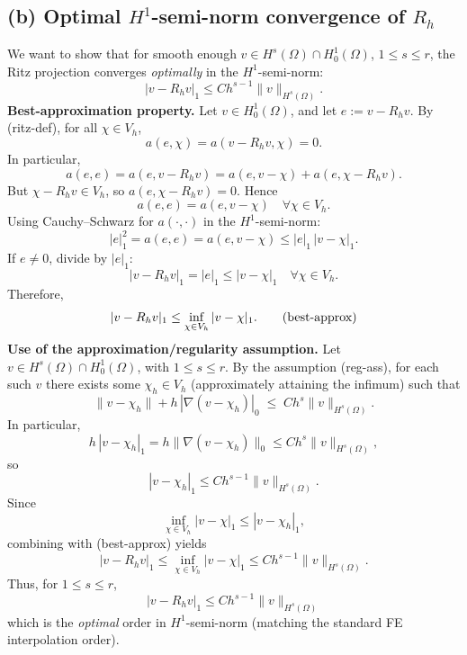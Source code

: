 \subsection*{(b) Optimal $H^1$-semi-norm convergence of $R_h$}
We want to show that for smooth enough \(v\in H^s(\Omega)\cap H^1_0(\Omega)\),
\(1\le s\le r\), the Ritz projection converges \emph{optimally} in the
\(H^1\)-semi-norm:
\[
    |v - R_h v|_1 \le C h^{s-1} \|v\|_{H^s(\Omega)}.
\]
\textbf{Best-approximation property.}
Let \(v\in H^1_0(\Omega)\), and let \(e := v - R_h v\).
By (ritz-def), for all \(\chi\in V_h\),
\[
    a(e,\chi) = a(v - R_h v, \chi) = 0.
\]
In particular,
\[
    a(e,e) = a(e, v - R_h v)
    = a(e, v - \chi) + a(e,\chi - R_h v).
\]
But \(\chi - R_h v \in V_h\), so \(a(e,\chi - R_h v)=0\). Hence
\[
    a(e,e) = a(e, v - \chi) \quad \forall \chi\in V_h.
\]
Using Cauchy--Schwarz for \(a(\cdot,\cdot)\) in the \(H^1\)-semi-norm:
\[
    |e|_1^2 = a(e,e) = a(e, v - \chi)
    \le |e|_1\,|v - \chi|_1.
\]
If \(e\neq 0\), divide by \(|e|_1\):
\[
    |v - R_h v|_1 = |e|_1 \le |v - \chi|_1 \quad \forall \chi\in V_h.
\]
Therefore,
\[
    |v - R_h v|_1 \le \inf_{\chi\in V_h} |v - \chi|_1. \tag{\text{best-approx}}
\]
\textbf{Use of the approximation/regularity assumption.}
Let \(v\in H^s(\Omega)\cap H^1_0(\Omega)\), with \(1\le s\le r\).
By the assumption (reg-ass), for each such \(v\) there exists some
\(\chi_h\in V_h\) (approximately attaining the infimum) such that
\[
    \|v - \chi_h\| + h\,|\nabla(v - \chi_h)|_0
    \;\le\; C h^s \|v\|_{H^s(\Omega)}.
\]
In particular,
\[
    h\,|v - \chi_h|_1
    = h \|\nabla(v - \chi_h)\|_0
    \le C h^s \|v\|_{H^s(\Omega)},
\]
so
\[
    |v - \chi_h|_1 \le C h^{s-1} \|v\|_{H^s(\Omega)}.
\]
Since
\[
    \inf_{\chi\in V_h} |v - \chi|_1 \le |v - \chi_h|_1,
\]
combining with (best-approx) yields
\[
    |v - R_h v|_1
    \le \inf_{\chi\in V_h} |v - \chi|_1
    \le C h^{s-1} \|v\|_{H^s(\Omega)}.
\]
Thus, for \(1\le s\le r\),
\[
    \boxed{
        |v - R_h v|_1 \le C h^{s-1} \|v\|_{H^s(\Omega)}
    }
\]
which is the \emph{optimal} order in \(H^1\)-semi-norm (matching the standard FE interpolation
order).

